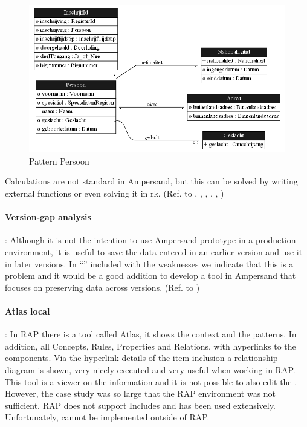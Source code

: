 \begin{figure}[H]
    \centering
        \includegraphics[width=1\textwidth]
            {../images/CDPatternPersoon.png}
        \caption{Pattern Persoon}
    \label{fig:pattern-persoon}
\end{figure}
Calculations are not standard in Ampersand, but this can be solved by writing external functions or even solving it in \acrshort{rk}.
(Ref. to  , , , , , )

\paragraph{\textbf{Version-gap analysis}}\label{swot:o_version_gap_analysis}:
Although it is not the intention to use Ampersand prototype in a production environment, it is useful to save the data entered in an earlier version and use it in later versions.
In ``'' included with the weaknesses we indicate that this is a problem and it would be a good addition to develop a tool in Ampersand that focuses on preserving data across versions.
(Ref. to )

\paragraph{\textbf{Atlas local}}\label{swot:o_atlas_local}:
In RAP there is a tool called Atlas, it shows the context and the patterns.
In addition, all Concepts, Rules, Properties and Relations, with hyperlinks to the components.
Via the hyperlink details of the item inclusion a relationship diagram is shown, very nicely executed and very useful when working in RAP.
This tool is a viewer on the information and it is not possible to also edit the .
However, the case study was so large that the RAP environment was not sufficient.
RAP does not support Includes and has been used extensively.
Unfortunately,  cannot be implemented outside of RAP.

